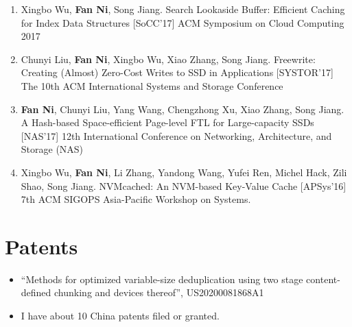 \documentclass{article}
\begin{document}
\begin{enumerate}
\item Xingbo Wu, \textbf{Fan Ni}, Song Jiang. Search Lookaside Buffer: Efficient Caching for Index Data Structures [SoCC'17] ACM Symposium on Cloud Computing 2017
\item Chunyi Liu, \textbf{Fan Ni}, Xingbo Wu, Xiao Zhang, Song Jiang. Freewrite: Creating (Almost) Zero-Cost Writes to SSD in Applications [SYSTOR'17] The 10th ACM International Systems and Storage Conference
\item \textbf{Fan Ni}, Chunyi Liu, Yang Wang, Chengzhong Xu, Xiao Zhang, Song Jiang. A Hash-based Space-efficient Page-level FTL for Large-capacity SSDs [NAS'17] 12th International Conference on Networking, Architecture, and Storage (NAS)
\item Xingbo Wu, \textbf{Fan Ni}, Li Zhang, Yandong Wang, Yufei Ren, Michel Hack, Zili Shao, Song Jiang. NVMcached: An NVM-based Key-Value Cache [APSys'16] 7th ACM SIGOPS Asia-Pacific Workshop on Systems.

\end{enumerate}
    

\section{Patents}
\begin{itemize}
    \item “Methods for optimized variable-size deduplication using two stage content-defined
chunking and devices thereof”, US20200081868A1
    \item I have about 10 China patents filed or granted.
\end{itemize}
\end{document}
